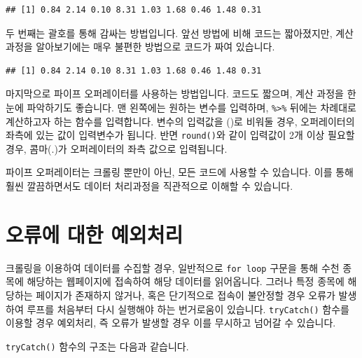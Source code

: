 \documentclass[12pt,]{book}
\newenvironment{Shaded}{\begin{snugshade}}{\end{snugshade}}
\newcommand{\DecValTok}[1]{\textcolor[rgb]{0.00,0.00,0.81}{#1}}
\newcommand{\KeywordTok}[1]{\textcolor[rgb]{0.13,0.29,0.53}{\textbf{#1}}}
\newcommand{\NormalTok}[1]{#1}
\newcommand{\OperatorTok}[1]{\textcolor[rgb]{0.81,0.36,0.00}{\textbf{#1}}}
\newcommand{\StringTok}[1]{\textcolor[rgb]{0.31,0.60,0.02}{#1}}
\begin{document}
\begin{verbatim}
## [1] 0.84 2.14 0.10 8.31 1.03 1.68 0.46 1.48 0.31
\end{verbatim}

두 번째는 괄호를 통해 감싸는 방법입니다. 앞선 방법에 비해 코드는 짧아졌지만, 계산 과정을 알아보기에는 매우 불편한 방법으로 코드가 짜여 있습니다.

\begin{Shaded}
\end{Shaded}

\begin{verbatim}
## [1] 0.84 2.14 0.10 8.31 1.03 1.68 0.46 1.48 0.31
\end{verbatim}

마지막으로 파이프 오퍼레이터를 사용하는 방법입니다. 코드도 짧으며, 계산 과정을 한눈에 파악하기도 좋습니다. 맨 왼쪽에는 원하는 변수를 입력하며, \texttt{\%\textgreater{}\%} 뒤에는 차례대로 계산하고자 하는 함수를 입력합니다. 변수의 입력값을 ()로 비워둘 경우, 오퍼레이터의 좌측에 있는 값이 입력변수가 됩니다. 반면 \texttt{round()}와 같이 입력값이 2개 이상 필요할 경우, 콤마(.)가 오퍼레이터의 좌측 값으로 입력됩니다.

파이프 오퍼레이터는 크롤링 뿐만이 아닌, 모든 코드에 사용할 수 있습니다. 이를 통해 훨씬 깔끔하면서도 데이터 처리과정을 직관적으로 이해할 수 있습니다.

\hypertarget{section-9}{%
\section{오류에 대한 예외처리}\label{section-9}}

크롤링을 이용하여 데이터를 수집할 경우, 일반적으로 \texttt{for\ loop} 구문을 통해 수천 종목에 해당하는 웹페이지에 접속하여 해당 데이터를 읽어옵니다. 그러나 특정 종목에 해당하는 페이지가 존재하지 않거나, 혹은 단기적으로 접속이 불안정할 경우 오류가 발생하여 루프를 처음부터 다시 실행해야 하는 번거로움이 있습니다. \texttt{tryCatch()} 함수를 이용할 경우 예외처리, 즉 오류가 발생할 경우 이를 무시하고 넘어갈 수 있습니다.

\texttt{tryCatch()} 함수의 구조는 다음과 같습니다.
\end{document}
